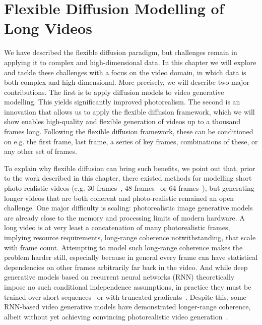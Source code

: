 \chapter{Flexible Diffusion Modelling of Long Videos}
\label{ch:fdm}

We have described the flexible diffusion paradigm, but challenges remain in applying it to complex and high-dimensional data. In this chapter we will explore and tackle these challenges with a focus on the video domain, in which data is both complex and high-dimensional. More precisely, we will describe two major contributions. The first is to apply diffusion models to video generative modelling. This yields significantly improved photorealism. The second is an innovation that allows us to apply the flexible diffusion framework, which we will show enables high-quality and flexible generation of videos up to a thousand frames long. Following the flexible diffusion framework, these can be conditioned on e.g. the first frame, last frame, a series of key frames, combinations of these, or any other set of frames.

To explain why flexible diffusion can bring such benefits, we point out that, prior to the work described in this chapter, there existed methods for modelling short photo-realistic videos (e.g. 30 frames~\citep{weissenborn2019scaling}, 48 frames~\cite{clark2019adversarial} or 64 frames~\citep{ho2022video}), but generating longer videos that are both coherent and photo-realistic remained an open challenge. 
One major difficulty is scaling: photorealistic image generative models~\citep{child2020very,dhariwal2021diffusion} are already close to the memory and processing limits of modern hardware.  A long video is at very least a concatenation of many photorealistic frames, implying resource requirements, long-range coherence notwithstanding, that scale with frame count. Attempting to model such long-range coherence makes the problem harder still, especially because in general every frame can have statistical dependencies on other frames arbitrarily far back in the video. And while deep generative models based on recurrent neural networks (RNN) theoretically impose no such conditional independence assumptions, in practice they must be trained over short sequences~\cite{gruslys2016memory,saxena2021clockwork} or with truncated gradients~\citep{tallec2017unbiasing}.  Despite this, some RNN-based video generative models have demonstrated longer-range coherence, albeit without yet achieving convincing photorealistic video generation~\citep{saxena2021clockwork,babaeizadeh2021fitvid,denton2018stochastic,kim2019variational,babaeizadeh2017stochastic}.


